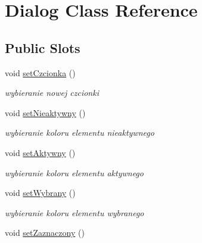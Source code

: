 \hypertarget{class_dialog}{
\section{Dialog Class Reference}
\label{class_dialog}
}
\subsection*{Public Slots}
\begin{DoxyCompactItemize}
\item 
\hypertarget{class_dialog_a72412a72c9220417a00ce60161e82d24}{
void \hyperlink{class_dialog_a72412a72c9220417a00ce60161e82d24}{setCzcionka} ()}
\label{class_dialog_a72412a72c9220417a00ce60161e82d24}

\begin{DoxyCompactList}\small\item\em wybieranie nowej czcionki \item\end{DoxyCompactList}\item 
\hypertarget{class_dialog_acb375039b29dfbceba8b6747bd59bf43}{
void \hyperlink{class_dialog_acb375039b29dfbceba8b6747bd59bf43}{setNieaktywny} ()}
\label{class_dialog_acb375039b29dfbceba8b6747bd59bf43}

\begin{DoxyCompactList}\small\item\em wybieranie koloru elementu nieaktywnego \item\end{DoxyCompactList}\item 
\hypertarget{class_dialog_ad49bf9c61de3aa39fda5f57d505acbcd}{
void \hyperlink{class_dialog_ad49bf9c61de3aa39fda5f57d505acbcd}{setAktywny} ()}
\label{class_dialog_ad49bf9c61de3aa39fda5f57d505acbcd}

\begin{DoxyCompactList}\small\item\em wybieranie koloru elementu aktywnego \item\end{DoxyCompactList}\item 
\hypertarget{class_dialog_a81673375d7c888401ce17f6649ccbec8}{
void \hyperlink{class_dialog_a81673375d7c888401ce17f6649ccbec8}{setWybrany} ()}
\label{class_dialog_a81673375d7c888401ce17f6649ccbec8}

\begin{DoxyCompactList}\small\item\em wybieranie koloru elementu wybranego \item\end{DoxyCompactList}\item 
\hypertarget{class_dialog_aa8fdc2340e2bc4fe80a98d6f112a7a85}{
void \hyperlink{class_dialog_aa8fdc2340e2bc4fe80a98d6f112a7a85}{setZaznaczony} ()}
\label{class_dialog_aa8fdc2340e2bc4fe80a98d6f112a7a85}


\end{DoxyCompactItemize}
